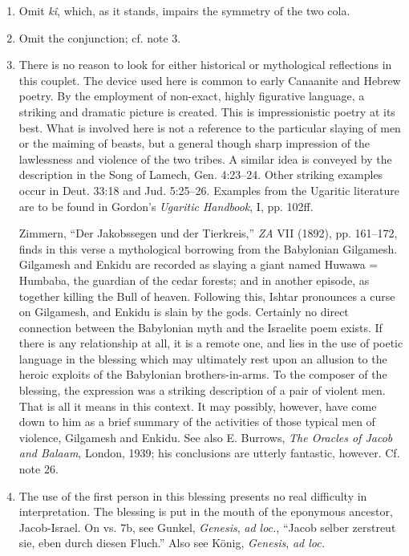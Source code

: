 \begin{enumerate}
\item
Omit \emph{kî}, which, as it stands, impairs the symmetry of the two cola.

\item
Omit the conjunction; cf. note 3.

\item
There is no reason to look for either historical or mythological reflections
in this couplet. The device used here is common to early Canaanite and Hebrew
poetry. By the employment of non-exact, highly figurative language, a striking
and dramatic picture is created. This is impressionistic poetry at its best.
What is involved here is not a reference to the particular slaying of men or
the maiming of beasts, but a general though sharp impression of the lawlessness
and violence of the two tribes. A similar idea is conveyed by the description
in the Song of Lamech, Gen. 4:23--24. Other striking examples occur in
Deut. 33:18 and Jud. 5:25--26. Examples from the Ugaritic literature are to be
found in Gordon's \emph{Ugaritic Handbook}, I, pp. 102ff.

Zimmern, ``Der Jakobssegen und der Tierkreis,'' \emph{ZA} VII (1892),
pp. 161--172, finds in this verse a mythological borrowing from the Babylonian
Gilgamesh. Gilgamesh and Enkidu are recorded as slaying a giant named Huwawa =
Humbaba, the guardian of the cedar forests; and in another episode, as together
killing the Bull of heaven. Following this, Ishtar pronounces a curse on
Gilgamesh, and Enkidu is slain by the gods. Certainly no direct connection
between the Babylonian myth and the Israelite poem exists. If there is any
relationship at all, it is a remote one, and lies in the use of poetic language
in the blessing which may ultimately rest upon an allusion to the heroic
exploits of the Babylonian brothers-in-arms. To the composer of the blessing,
the expression was a striking description of a pair of violent men. That is all
it means in this context. It may possibly, however, have come down to him as a
brief summary of the activities of those typical men of violence, Gilgamesh
and Enkidu. See also E. Burrows, \emph{The Oracles of Jacob and Balaam},
London, 1939; his conclusions are utterly fantastic, however. Cf. note 26.

\item
The use of the first person in this blessing presents no real difficulty in
interpretation. The blessing is put in the mouth of the eponymous ancestor,
Jacob-Israel. On vs. 7b, see Gunkel, \emph{Genesis}, \emph{ad loc.},
``Jacob selber zerstreut sie, eben durch diesen Fluch.'' Also see König,
\emph{Genesis}, \emph{ad loc.}


\end{enumerate}
